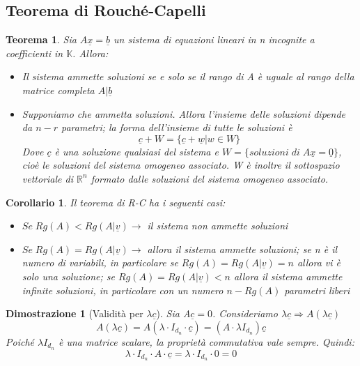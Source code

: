 \documentclass[12pt]{article}
\newenvironment{para}{\begin{adjustwidth}{13mm}{}}{\end{adjustwidth}}
\newtheorem{Corollario}{Corollario}[subsection]
\newtheorem{Teorema}{Teorema}[subsection]
\newtheorem{Dimostrazione}{Dimostrazione}[subsection]
\begin{document}
\begin{para}
\subsection{Teorema di Rouché-Capelli}
\begin{Teorema}
    Sia $A \underline{x} = \underline{b}$ un sistema di equazioni lineari in n incognite a coefficienti in $\mathbb{K}$. Allora:
    \begin{itemize}
        \item Il sistema ammette soluzioni se e solo se il rango di A è uguale al rango della matrice completa $A|\underline{b}$
        \item Supponiamo che ammetta soluzioni. Allora l'insieme delle soluzioni dipende da $n-r$ parametri; la forma dell'insieme di tutte le soluzioni è $$\underline{c}+W = \{\underline{c}+\underline{w}|w\in W\}$$ Dove $\underline{c}$ è una soluzione qualsiasi del sistema e $W = \{soluzioni \; di\; A\underline{x} = \underline{0}\}$, cioè le soluzioni del sistema omogeneo associato. W è inoltre il sottospazio vettoriale di $\mathbb{R}^n$ formato dalle soluzioni del sistema omogeneo associato.
    \end{itemize}
\end{Teorema}
\begin{Corollario}
    Il teorema di R-C ha i seguenti casi: \begin{itemize}
        \item $Se \; Rg(A) < Rg(A|\underline{v}) \rightarrow$ il sistema non ammette soluzioni
        \item $Se \; Rg(A) = Rg(A|\underline{v}) \rightarrow$ allora il sistema ammette soluzioni; se n è il numero di variabili, in particolare se $Rg(A) = Rg(A|\underline{v}) = n$ allora vi è solo una soluzione; se $Rg(A) = Rg(A|\underline{v}) < n$ allora il sistema ammette infinite soluzioni, in particolare con un numero $n-Rg(A)$ parametri liberi
    \end{itemize}
\end{Corollario}
\begin{Dimostrazione}[Validità per $\lambda \underline{c}$]
Sia A$\underline{c} = 0$. Consideriamo $\lambda\underline{c} \Rightarrow A(\lambda\underline{c})$
$$A(\lambda\underline{c})=A(\lambda \cdot I_{d_n} \cdot \underline{c}) = (A \cdot \lambda I_{d_n})\underline{c}$$
Poiché $\lambda I_{d_n}$ è una matrice scalare, la proprietà commutativa vale sempre. Quindi:
$$\lambda \cdot I_{d_n} \cdot A \cdot \underline{c} = \lambda \cdot I_{d_n} \cdot 0 = 0$$
\end{Dimostrazione}


\end{para}
\end{document}

